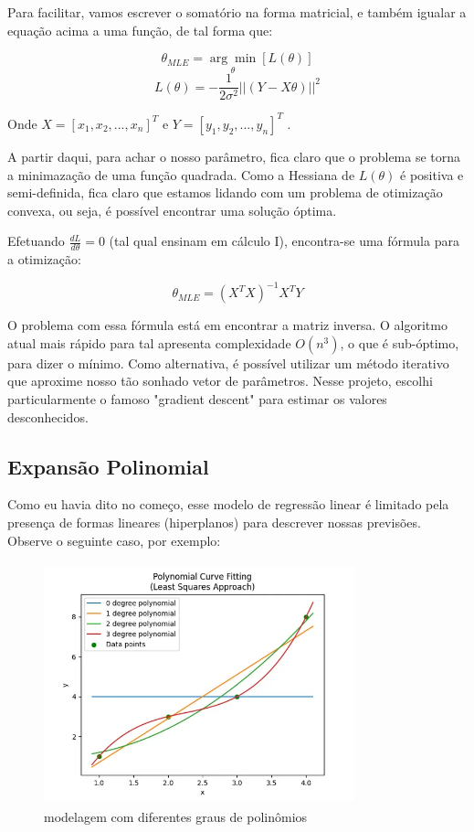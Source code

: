 \documentclass{article}
\begin{document}
Para facilitar, vamos escrever o somatório na forma matricial,
e também igualar a equação acima a uma função, de tal forma
que:

\begin{equation}
    \theta_{MLE} = \underset{\theta}{\arg\min} [L(\theta)]
\end{equation}
\begin{equation}
    L(\theta) = -\frac{1}{2\sigma^{2}}
    ||(Y - X\theta)||^{2}
\end{equation}

Onde $X = [x_{1}, x_{2}, ..., x_{n}]^{T}$ e 
$Y = [y_{1}, y_{2}, ..., y_{n}]^{T}$ .

A partir daqui, para achar o nosso parâmetro, fica claro que
o problema se torna a minimazação de uma função quadrada. Como
a Hessiana de $L(\theta)$ é positiva e semi-definida, fica claro
que estamos lidando com um problema de otimização convexa, ou
seja, é possível encontrar uma solução óptima. 

Efetuando $\frac{dL}{d\theta} = 0$ (tal qual ensinam em cálculo I),
encontra-se uma fórmula para a otimização:

\begin{equation}
    \theta_{MLE} = (X^{T}X)^{-1}X^{T}Y
\end{equation}

O problema com essa fórmula está em encontrar a matriz inversa.
O algoritmo atual mais rápido para tal apresenta complexidade
$O(n^{3})$, o que é sub-óptimo, para dizer o mínimo. Como 
alternativa, é possível utilizar um método iterativo que aproxime
nosso tão sonhado vetor de parâmetros. Nesse projeto, escolhi
particularmente o famoso "gradient descent" para estimar os
valores desconhecidos.

\subsection{Expansão Polinomial}

Como eu havia dito no começo, esse modelo de regressão linear
é limitado pela presença de formas lineares (hiperplanos) para
descrever nossas previsões. Observe o seguinte caso, por exemplo:

\begin{figure}[h!]
    \includegraphics[width=9cm, height=7cm]{pool.png}
    \centering
    \caption{modelagem com diferentes graus de polinômios}
  \end{figure}
\end{document}
